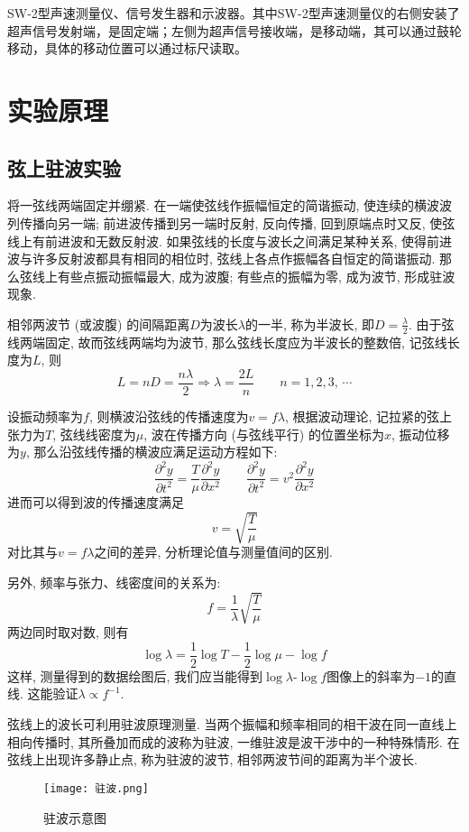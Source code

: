 \documentclass[11pt]{article}
\newcommand*{\pderivh}[3]{\frac{\partial^{#1} #2}{\partial {#3^{#1}}}}
\begin{document}
SW-2型声速测量仪、信号发生器和示波器。其中SW-2型声速测量仪的右侧安装了超声信号发射端，是固定端；左侧为超声信号接收端，是移动端，其可以通过鼓轮移动，具体的移动位置可以通过标尺读取。

\section{实验原理}

\subsection{弦上驻波实验}

将一弦线两端固定并绷紧. 在一端使弦线作振幅恒定的简谐振动, 使连续的横波波列传播向另一端; 前进波传播到另一端时反射, 反向传播, 回到原端点时又反, 使弦线上有前进波和无数反射波. 如果弦线的长度与波长之间满足某种关系, 使得前进波与许多反射波都具有相同的相位时, 弦线上各点作振幅各自恒定的简谐振动. 那么弦线上有些点振动振幅最大, 成为波腹; 有些点的振幅为零, 成为波节, 形成驻波现象. 

相邻两波节 (或波腹) 的间隔距离$D$为波长$\lambda$的一半, 称为半波长, 即$D=\frac{\lambda}{2}$. 由于弦线两端固定, 故而弦线两端均为波节, 那么弦线长度应为半波长的整数倍, 记弦线长度为$L$, 则
\[
    L = nD = \frac{n\lambda}{2} \Longrightarrow \lambda = \frac{2L}{n} \qquad n=1,2,3,\,\cdots
\]

设振动频率为$f$, 则横波沿弦线的传播速度为$v=f\lambda$, 根据波动理论, 记拉紧的弦上张力为$T$, 弦线线密度为$\mu$, 波在传播方向 (与弦线平行) 的位置坐标为$x$, 振动位移为$y$, 那么沿弦线传播的横波应满足运动方程如下: 
\[
    \pderivh{2}yt = \frac{T}{\mu} \pderivh{2}yx  \qquad  \pderivh{2}yt = v^2\pderivh{2}yx
\]
进而可以得到波的传播速度满足
\[
    v = \sqrt{\frac{T}{\mu}}
\]
对比其与$v = f\lambda$之间的差异, 分析理论值与测量值间的区别. 

另外, 频率与张力、线密度间的关系为:
\[
    f = \frac{1}{\lambda} \sqrt{\frac T\mu}
\]
两边同时取对数, 则有
\begin{equation}
    \log\lambda = \frac{1}{2}\log T - \frac{1}{2}\log\mu - \log f
\end{equation}
这样, 测量得到的数据绘图后, 我们应当能得到$\log\lambda$-$\log f$图像上的斜率为$-1$的直线. 这能验证$\lambda \propto f^{-1}$.

弦线上的波长可利用驻波原理测量. 当两个振幅和频率相同的相干波在同一直线上相向传播时, 其所叠加而成的波称为驻波, 一维驻波是波干涉中的一种特殊情形. 在弦线上出现许多静止点, 称为驻波的波节, 相邻两波节间的距离为半个波长. 

\begin{figure}[H]
    \centering
    \texttt{[image: 驻波.png]}
    \caption{驻波示意图}
\end{figure}
\end{document}
